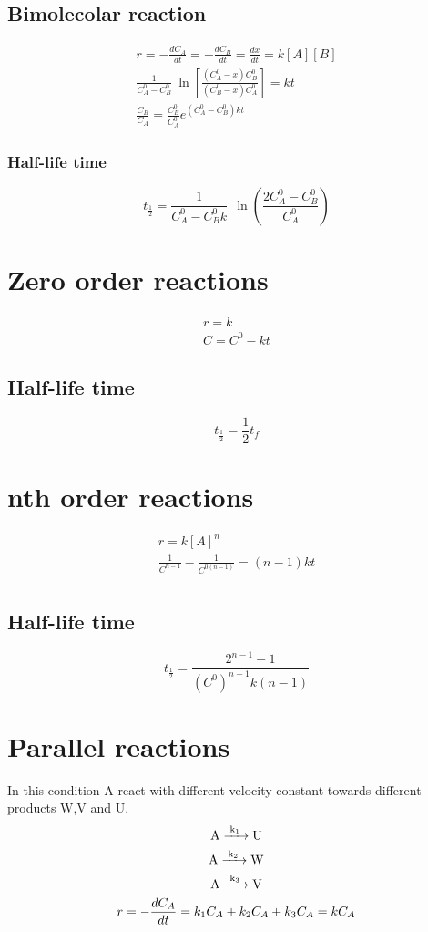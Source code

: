 \documentclass[../Master.tex]{subfiles}
\begin{document}
\begin{multicols*}{2}
	\subsection{Bimolecolar reaction}
	\begin{gather*}
		r = - \frac{dC_{A}}{dt} = - \frac{dC_{B}}{dt} = \frac{dx}{dt} = k[A][B] \\
		\frac{1}{C_{A} ^{0} - C_{B} ^{0} }~\ln\left[\frac{(C_{A} ^{0} - x)C_{B} ^{0} }{(C_{B} ^{0} - x) C_{A} ^{0} }\right] = kt\\
		\frac{C_{B}}{C_{A}} = \frac{C_{B} ^{0} }{C_{A} ^{0} }e^{(C_{A} ^{0}-C_{B} ^{0}  )kt}
	\end{gather*}

	\subsubsection{Half-life time}
	\[
		t_{\frac{1}{2}} = \frac{1}{C_{A} ^{0} - C_{B} ^{0} k}~ ~  \ln\left(  \frac{2C_{A} ^{0} - C_{B}^{0} }{C_{A}^{0}} \right)
	\]

	\section{Zero order reactions}
	\begin{gather*}
		r = k\\
		C = C^0 - kt
	\end{gather*}
	\subsection{Half-life time}
	\[
		t_{\frac{1}{2}}  = \frac{1}{2}t_{f}
	\]
	\section{nth order reactions}
	\begin{gather*}
		r = k[A]^{n} \\
		\frac{1}{C^{n-1} } - \frac{1}{C^{0(n-1 )} } = (n-1)kt\\
	\end{gather*}
	\subsection{Half-life time}
	\[
		t_{\frac{1}{2}} = \frac{2^{n-1} -1 }{(C^{0} )^{n-1} k(n-1)}
	\]

	\section{Parallel reactions}
	In this condition A react with different velocity constant towards different
	products W,V and U.
	\begin{gather*}
		\ce{ A ->[{k_{1}}] U} \\
		\ce{ A ->[{k_{2}}] W} \\
		\ce{ A ->[{k_{3}}] V} \\
		r =  - \frac{dC_{A} }{dt} = k_{1}C_{A} + k_{2}C_{A} + k_{3}C_{A} = kC_{A}
	\end{gather*}


\end{multicols*}
\end{document}
